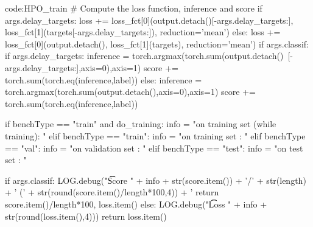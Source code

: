 \begin{mycodebox}{code:HPO_train}
            # Compute the loss function, inference and score
            if args.delay_targets:
                loss += loss_fct[0](output.detach()[-args.delay_targets:], loss_fct[1](targets[-args.delay_targets:]), reduction='mean')
            else:
                loss += loss_fct[0](output.detach(), loss_fct[1](targets), reduction='mean')
            if args.classif:
                if args.delay_targets:
                    inference = torch.argmax(torch.sum(output.detach()\
                        [-args.delay_targets:],axis=0),axis=1)
                    score += torch.sum(torch.eq(inference,label))
                else:
                    inference = torch.argmax(torch.sum(output.detach(),axis=0),axis=1)
                    score += torch.sum(torch.eq(inference,label))
        
    if benchType == "train" and do_training:
        info = "on training set (while training): "
    elif benchType == "train":
        info = "on training set                 : "
    elif benchType == "val":
        info = "on validation set               : "
    elif benchType == "test":
        info = "on test set                     : "

    if args.classif:
        LOG.debug("\t\t Score " + info + str(score.item()) + '/' + str(length) + ' (' + str(round(score.item()/length*100,4)) + '%
        return score.item()/length*100, loss.item()
    else:
        LOG.debug("\t\t Loss " + info + str(round(loss.item(),4)))
        return loss.item()
\end{mycodebox}
